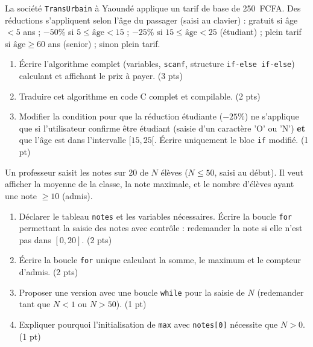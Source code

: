 \documentclass[11pt]{article}
\begin{document}
\begin{exercice}
La société \texttt{TransUrbain} à Yaoundé applique un tarif de base de \SI{250}{FCFA}. Des réductions s'appliquent selon l'âge du passager (saisi au clavier) : gratuit si âge $< 5$ ans ; $-50\%$ si $5 \le \text{âge} < 15$ ; $-25\%$ si $15 \le \text{âge} < 25$ (étudiant) ; plein tarif si $\text{âge} \ge 60$ ans (senior) ; sinon plein tarif.
\begin{enumerate}
    \item Écrire l'algorithme complet (variables, \texttt{scanf}, structure \texttt{if-else if-else}) calculant et affichant le prix à payer. (3 pts)
    \item Traduire cet algorithme en code C complet et compilable. (2 pts)
    \item Modifier la condition pour que la réduction étudiante ($-25\%$) ne s'applique que si l'utilisateur confirme être étudiant (saisie d'un caractère 'O' ou 'N') \textbf{et} que l'âge est dans l'intervalle $[15, 25[$. Écrire uniquement le bloc \texttt{if} modifié. (1 pt)
\end{enumerate}
\end{exercice}

\begin{exercice}
Un professeur saisit les notes sur 20 de $N$ élèves ($N \le 50$, saisi au début). Il veut afficher la moyenne de la classe, la note maximale, et le nombre d'élèves ayant une note $\ge 10$ (admis).
\begin{enumerate}
    \item Déclarer le tableau \texttt{notes} et les variables nécessaires. Écrire la boucle \texttt{for} permettant la saisie des notes avec contrôle : redemander la note si elle n'est pas dans $[0, 20]$. (2 pts)
    \item Écrire la boucle \texttt{for} unique calculant la somme, le maximum et le compteur d'admis. (2 pts)
    \item Proposer une version avec une boucle \texttt{while} pour la saisie de $N$ (redemander tant que $N < 1$ ou $N > 50$). (1 pt)
    \item Expliquer pourquoi l'initialisation de \texttt{max} avec \texttt{notes[0]} nécessite que $N > 0$. (1 pt)
\end{enumerate}
\end{exercice}
\end{document}
